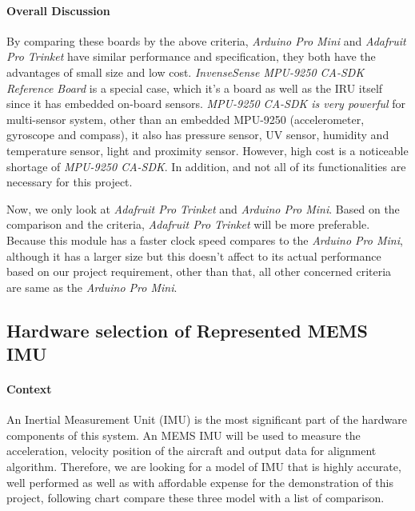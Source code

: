 \hfill \break
\paragraph{Overall Discussion}
By comparing these boards by the above criteria, \textit{Arduino Pro Mini} and \textit{Adafruit Pro Trinket} have similar performance and specification, they both have the advantages of small size and low cost. \textit{InvenseSense MPU-9250 CA-SDK Reference Board} is a special case, which it’s a board as well as the IRU itself since it has embedded on-board sensors. \textit{MPU-9250 CA-SDK is very powerful} for multi-sensor system, other than an embedded MPU-9250 (accelerometer, gyroscope and compass), it also has pressure sensor, UV sensor, humidity and temperature sensor, light and proximity sensor. However, high cost is a noticeable shortage of \textit{MPU-9250 CA-SDK}. In addition, and not all of its functionalities are necessary for this project.

Now, we only look at \textit{Adafruit Pro Trinket} and \textit{Arduino Pro Mini}. Based on the comparison and the criteria, \textit{Adafruit Pro Trinket} will be more preferable. Because this module has a faster clock speed compares to the \textit{Arduino Pro Mini}, although it has a larger size but this doesn’t affect to its actual performance based on our project requirement, other than that, all other concerned criteria are same as the \textit{Arduino Pro Mini}.



\subsection{Hardware selection of Represented MEMS IMU}
\paragraph{Context}
An Inertial Measurement Unit (IMU) is the most significant part of the hardware components of this system. An MEMS IMU will be used to measure the acceleration, velocity position of the aircraft and output data for alignment algorithm. Therefore, we are looking for a model of IMU that is highly accurate, well performed as well as with affordable expense for the demonstration of this project, following chart compare these three model with a list of comparison.\\


